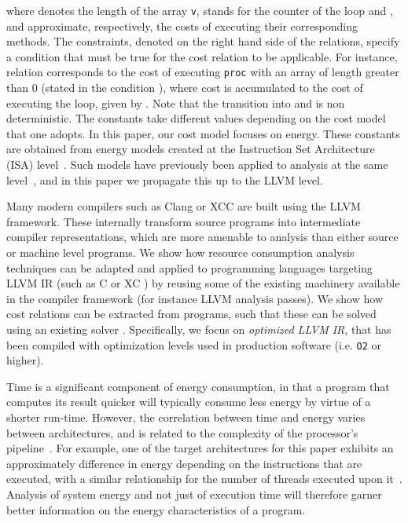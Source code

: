 \documentclass[9pt,preprint]{sigplanconf}
\begin{document}
where  denotes the length of the array \texttt{v},  stands for the counter of the
loop and ,  and  approximate, respectively, the
costs of executing their corresponding methods. The constraints, denoted on the
right hand side of the relations, specify a condition that must be true for the
cost relation to be applicable. For instance, relation 
corresponds to the cost of executing \texttt{proc} with an array of length
greater than 0 (stated in the condition ), where cost  is
accumulated to the cost of executing the loop, given by . Note that the
transition into  and  is non deterministic. The constants
 take different values depending on the cost model that one
adopts. In this paper, our cost model focuses on energy. These constants are
obtained from energy models created at the Instruction Set Architecture (ISA)
level~\cite{Kerrison13}. Such models have previously been applied to analysis at
the same level~\cite{NMHLFM08, isa-energy-lopstr13}, and in this paper we
propagate this up to the LLVM level.

Many modern compilers such as Clang or XCC are built using the LLVM framework. These
internally transform source programs into intermediate compiler representations,
which are more amenable to analysis than either source or machine level
programs. We show
how resource consumption analysis techniques can be adapted and applied to
programming languages targeting LLVM IR (such as C or XC \cite{xc}) by reusing some of the
existing machinery available in the compiler framework (for
instance LLVM analysis passes).
We show how cost relations  can be extracted from programs, such that these can
be solved using an existing solver \cite{AlbertAGP11a}. Specifically, we focus on
\emph{optimized LLVM IR}, that has been compiled with optimization levels
used in production software (i.e. \texttt{O2} or higher).

Time is a significant component of energy consumption, in that a program that
computes its result quicker will typically consume less energy by virtue of a
shorter run-time. However, the correlation between time and energy varies
between architectures, and is related to the complexity of the processor's pipeline~\cite{Pallister2013}.
For example, one of the target architectures for this
paper exhibits an approximately  difference in energy depending on the
instructions that are executed, with a similar relationship for the number of
threads executed upon it~\cite{Kerrison13}. Analysis of system energy and not
just of execution time will therefore garner better information on the energy
characteristics of a program.
\end{document}
